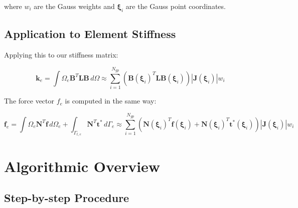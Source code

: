 \documentclass[
  11pt,
  a4paper,
]{scrbook}
\begin{document}
where \(w_i\) are the Gauss weights and \(\boldsymbol{\xi}_i\) are the
Gauss point coordinates.

\subsection{Application to Element
Stiffness}\label{application-to-element-stiffness}

Applying this to our stiffness matrix:

\[\mathbf{k}_e = \int{\Omega_e} \mathbf{B}^T \mathbf{L} \mathbf{B} \, d\Omega \approx \sum_{i=1}^{N_{gp}} \left( \mathbf{B}(\boldsymbol{\xi}_i)^T \mathbf{L} \mathbf{B}(\boldsymbol{\xi}_i) \right) |\mathbf{J}(\boldsymbol{\xi}_i)| w_i\]

The force vector \(f_e\) is computed in the same way:

\[\mathbf{f}_e = \int{\Omega_e} \mathbf{N}^T \mathbf{f} \, d\Omega_e + \int_{\Gamma_{t,e}} \mathbf{N}^T \mathbf{t}^* \, d\Gamma_e \approx \sum_{i=1}^{N_{gp}} \left( \mathbf{N}(\boldsymbol{\xi}_i)^T \mathbf{f}(\boldsymbol{\xi}_i) + \mathbf{N}(\boldsymbol{\xi}_i)^T \mathbf{t}^*(\boldsymbol{\xi}_i) \right) |\mathbf{J}(\boldsymbol{\xi}_i)| w_i\]

\section{Algorithmic Overview}\label{algorithmic-overview}

\subsection{Step-by-step Procedure}\label{step-by-step-procedure}
\end{document}
